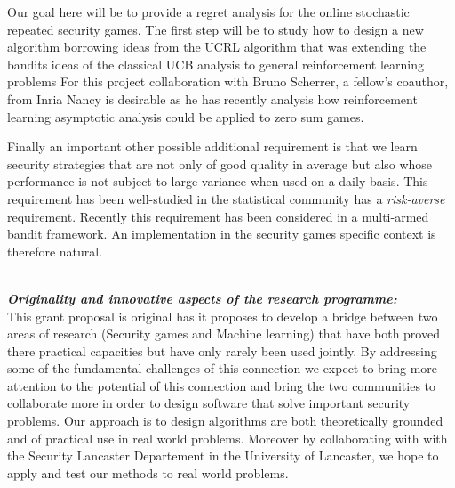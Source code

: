 Our goal here will be to provide a regret analysis for the online stochastic repeated security games. The first step will be to study  how to design a new algorithm borrowing ideas from the UCRL algorithm \cite{auer2009near} that was extending the bandits ideas of the classical UCB analysis to general reinforcement learning problems
For this project collaboration with  Bruno Scherrer, a fellow's coauthor, from Inria Nancy is desirable as he has recently analysis how reinforcement learning asymptotic analysis could be applied to zero sum games\cite{scherrerapproximate}.


Finally an important other possible additional requirement is that we learn security strategies that are not only of good quality in average but also whose performance is not subject to large variance when used on a daily basis. This requirement has been well-studied in the statistical community has a \textit{risk-averse} requirement. Recently this requirement has been considered in a multi-armed bandit framework\cite{NIPS2012_4753}. An implementation in the security games specific context is therefore natural.




\noindent \textbf{\textit{\\Originality and innovative aspects of the research programme:}}\\
This grant proposal is original has it proposes to develop a bridge between two areas of research (Security games and Machine learning) that have both proved there practical capacities but have only rarely been used jointly. By addressing some of the fundamental challenges of this connection we expect to bring more attention to the potential of this connection and bring the two communities to collaborate more in order to design software that solve important security problems.
Our approach is to design algorithms are both theoretically grounded and of practical use in real world problems.
Moreover by collaborating with with the Security Lancaster Departement in the University of Lancaster, we hope to apply and test our methods to real world problems.
 
